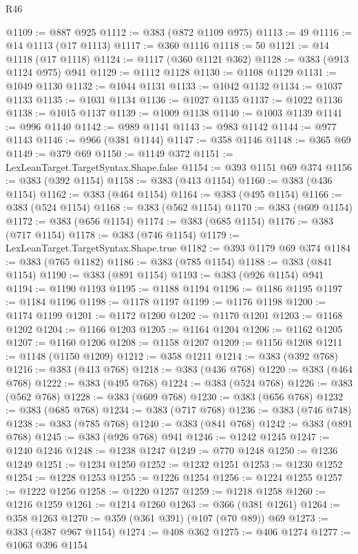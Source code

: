 \begin{lexlean}{R46}
\begin{coremodule}
@1109 := @887 @925
@1112 := @383 (@872 @1109 @975)
@1113 := 49
@1116 := @14 @1113 (@17 @1113)
@1117 := @360 @1116
@1118 := 50
@1121 := @14 @1118 (@17 @1118)
@1124 := @1117 (@360 @1121 @362)
@1128 := @383 (@913 @1124 @975) @941
@1129 := @1112 @1128
@1130 := @1108 @1129
@1131 := @1049 @1130
@1132 := @1044 @1131
@1133 := @1042 @1132
@1134 := @1037 @1133
@1135 := @1031 @1134
@1136 := @1027 @1135
@1137 := @1022 @1136
@1138 := @1015 @1137
@1139 := @1009 @1138
@1140 := @1003 @1139
@1141 := @996 @1140
@1142 := @989 @1141
@1143 := @983 @1142
@1144 := @977 @1143
@1146 := @966 (@381 @1144)
@1147 := @358 @1146
@1148 := @365 @69
@1149 := @379 @69
@1150 := @1149 @372
@1151 := LexLeanTarget.TargetSyntax.Shape.false
@1154 := @393 @1151 @69 @374
@1156 := @383 (@392 @1154)
@1158 := @383 (@413 @1154)
@1160 := @383 (@436 @1154)
@1162 := @383 (@464 @1154)
@1164 := @383 (@495 @1154)
@1166 := @383 (@524 @1154)
@1168 := @383 (@562 @1154)
@1170 := @383 (@609 @1154)
@1172 := @383 (@656 @1154)
@1174 := @383 (@685 @1154)
@1176 := @383 (@717 @1154)
@1178 := @383 (@746 @1154)
@1179 := LexLeanTarget.TargetSyntax.Shape.true
@1182 := @393 @1179 @69 @374
@1184 := @383 (@765 @1182)
@1186 := @383 (@785 @1154)
@1188 := @383 (@841 @1154)
@1190 := @383 (@891 @1154)
@1193 := @383 (@926 @1154) @941
@1194 := @1190 @1193
@1195 := @1188 @1194
@1196 := @1186 @1195
@1197 := @1184 @1196
@1198 := @1178 @1197
@1199 := @1176 @1198
@1200 := @1174 @1199
@1201 := @1172 @1200
@1202 := @1170 @1201
@1203 := @1168 @1202
@1204 := @1166 @1203
@1205 := @1164 @1204
@1206 := @1162 @1205
@1207 := @1160 @1206
@1208 := @1158 @1207
@1209 := @1156 @1208
@1211 := @1148 (@1150 @1209)
@1212 := @358 @1211
@1214 := @383 (@392 @768)
@1216 := @383 (@413 @768)
@1218 := @383 (@436 @768)
@1220 := @383 (@464 @768)
@1222 := @383 (@495 @768)
@1224 := @383 (@524 @768)
@1226 := @383 (@562 @768)
@1228 := @383 (@609 @768)
@1230 := @383 (@656 @768)
@1232 := @383 (@685 @768)
@1234 := @383 (@717 @768)
@1236 := @383 (@746 @748)
@1238 := @383 (@785 @768)
@1240 := @383 (@841 @768)
@1242 := @383 (@891 @768)
@1245 := @383 (@926 @768) @941
@1246 := @1242 @1245
@1247 := @1240 @1246
@1248 := @1238 @1247
@1249 := @770 @1248
@1250 := @1236 @1249
@1251 := @1234 @1250
@1252 := @1232 @1251
@1253 := @1230 @1252
@1254 := @1228 @1253
@1255 := @1226 @1254
@1256 := @1224 @1255
@1257 := @1222 @1256
@1258 := @1220 @1257
@1259 := @1218 @1258
@1260 := @1216 @1259
@1261 := @1214 @1260
@1263 := @366 (@381 @1261)
@1264 := @358 @1263
@1270 := @359 (@361 @391) (@107 (@70 @89)) @69
@1273 := @383 (@387 @967 @1154)
@1274 := @408 @362
@1275 := @406 @1274
@1277 := @1063 @396 @1154

\end{coremodule}
\end{lexlean}
